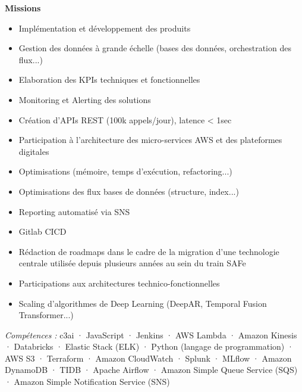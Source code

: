 \documentclass[10pt, a4paper]{article}
\begin{document}
{            \textbf{Missions}
            \begin{itemize}
                \item Implémentation et développement des produits
                \item Gestion des données à grande échelle (bases des données, orchestration des flux...)
                \item Elaboration des KPIs techniques et fonctionnelles
                \item Monitoring et Alerting des solutions
                \item Création d'APIs REST (100k appels/jour), latence < 1sec
                \item Participation à l'architecture des micro-services AWS et des plateformes digitales
                \item Optimisations (mémoire, temps d'exécution, refactoring...)
                \item Optimisations des flux bases de données (structure, index...)
                \item Reporting automatisé via SNS
                \item Gitlab CICD
                \item Rédaction de roadmaps dans le cadre de la migration d'une technologie centrale utilisée depuis plusieurs années au sein du train SAFe
                \item Participations aux architectures technico-fonctionnelles
                \item Scaling d'algorithmes de Deep Learning (DeepAR, Temporal Fusion Transformer...) 
            \end{itemize}
    
            \textit{Compétences :} c3ai · JavaScript · Jenkins · AWS Lambda · Amazon Kinesis · Databricks · Elastic Stack (ELK) · Python (langage de programmation) · AWS S3 · Terraform · Amazon CloudWatch · Splunk · MLflow · Amazon DynamoDB · TIDB · Apache Airflow · Amazon Simple Queue Service (SQS) · Amazon Simple Notification Service (SNS)
        }
        
\end{document}
